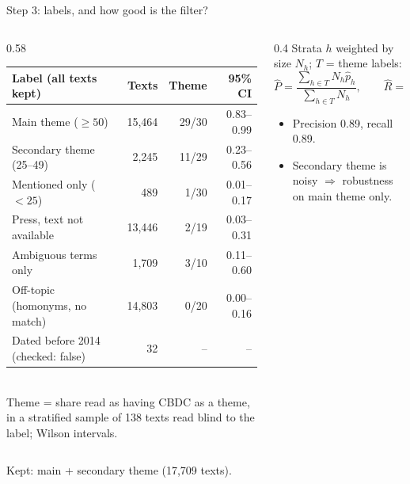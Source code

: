\documentclass[aspectratio=169,10pt]{beamer}
\begin{document}
\begin{frame}{Step 3: labels, and how good is the filter?}
\begin{columns}[T]
\begin{column}{0.58\textwidth}\scriptsize
\setlength{\tabcolsep}{3pt}
\begin{tabular}{@{}lrrr@{}}\toprule
\textbf{Label (all texts kept)} & \textbf{Texts} & \textbf{Theme} & \textbf{95\% CI}\\\midrule
Main theme ($\geq 50$) & 15,464 & 29/30 & 0.83--0.99 \\
Secondary theme (25--49) & 2,245 & 11/29 & 0.23--0.56 \\
Mentioned only ($<25$) & 489 & 1/30 & 0.01--0.17 \\
Press, text not available & 13,446 & 2/19 & 0.03--0.31 \\
Ambiguous terms only & 1,709 & 3/10 & 0.11--0.60 \\
Off-topic (homonyms, no match) & 14,803 & 0/20 & 0.00--0.16 \\
Dated before 2014 (checked: false) & 32 & -- & -- \\
\bottomrule\end{tabular}\\[3pt]
Theme = share read as having CBDC as a theme, in a stratified sample of 138 texts read blind to the label; Wilson intervals.
\end{column}
\begin{column}{0.4\textwidth}\small
Strata $h$ weighted by size $N_h$; $T$ = theme labels:
\[ \widehat{P} = \frac{\sum_{h\in T} N_h \hat p_h}{\sum_{h\in T} N_h}, \qquad \widehat{R} = \frac{\sum_{h\in T} N_h \hat p_h}{\sum_{h} N_h \hat p_h} \]
\begin{itemize}\setlength\itemsep{1pt}
\item Precision \alert{0.89}, recall \alert{0.89}.
\item Secondary theme is noisy $\Rightarrow$ robustness on main theme only.
\end{itemize}
\end{column}
\end{columns}
\vspace{2pt}
\small Kept: \alert{main + secondary theme} (17,709 texts).
\end{frame}
\end{document}
